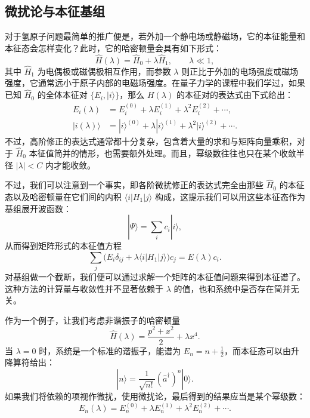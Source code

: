 \subsection{微扰论与本征基组}

对于氢原子问题最简单的推广便是，若外加一个静电场或静磁场，它的本征能量和本征态会怎样变化？此时，它的哈密顿量会具有如下形式：
\begin{equation}
 \hat H(\lambda)=\hat H_0+\lambda\hat H_1,\qquad \lambda\ll1,
\tag{6.1.3}
\end{equation}
其中 $\hat H_1$ 为电偶极或磁偶极相互作用，而参数 $\lambda$ 则正比于外加的电场强度或磁场强度，它通常远小于原子内部的电磁场强度。在量子力学的课程中我们学过，如果已知 $\hat H_0$ 的全体本征对 $\{E_i,|i\rangle\}$，那么 $H(\lambda)$ 的本征对的表达式由下式给出：
\begin{equation}
\begin{aligned}
 E_i(\lambda)&=E_i^{(0)}+\lambda E_i^{(1)}+\lambda^2E_i^{(2)}+\cdots,\\
 |i(\lambda)\rangle&=|i\rangle^{(0)}+\lambda|i\rangle^{(1)}+\lambda^2|i\rangle^{(2)}+\cdots.
\end{aligned}
\tag{6.1.4}
\end{equation}
不过，高阶修正的表达式通常都十分复杂，包含着大量的求和与矩阵向量乘积，对于 $\hat H_0$ 本征值简并的情形，也需要额外处理。而且，幂级数往往也只在某个收敛半径 $|\lambda|<C$ 内才能收敛。

不过，我们可以注意到一个事实，即各阶微扰修正的表达式完全由那些 $\hat H_0$ 的本征态以及哈密顿量在它们间的内积 $\langle i|H_1|j\rangle$ 构成，这提示我们可以用这些本征态作为基组展开波函数：
\begin{equation}
 |\Psi\rangle=\sum_i c_i|i\rangle,
\tag{6.1.5}
\end{equation}
从而得到矩阵形式的本征值方程
\begin{equation}
 \sum_j\bigl(E_i\delta_{ij}+\lambda\langle i|H_1|j\rangle\bigr)c_j=E(\lambda)c_i.
\tag{6.1.6}
\end{equation}
对基组做一个截断，我们便可以通过求解一个矩阵的本征值问题来得到本征谱了。这种方法的计算量与收敛性并不显著依赖于 $\lambda$ 的值，也和系统中是否存在简并无关。

作为一个例子，让我们考虑非谐振子的哈密顿量
\begin{equation}
 \hat H(\lambda)=\frac{p^2+x^2}{2}+\lambda x^4.
\tag{6.1.7}
\end{equation}
当 $\lambda=0$ 时，系统是一个标准的谐振子，能谱为 $E_n=n+\tfrac12$，而本征态可以由升降算符给出：
\begin{equation}
 |n\rangle=\frac{1}{\sqrt{n!}}(\hat a^\dagger)^n|0\rangle.
\tag{6.1.8}
\end{equation}
如果我们将依赖的项视作微扰，使用微扰论，最后得到的结果应当是某个幂级数：
\begin{equation}
 E_n(\lambda)=E_n^{(0)}+\lambda E_n^{(1)}+\lambda^2E_n^{(2)}+\cdots.
\tag{6.1.9}
\end{equation}

